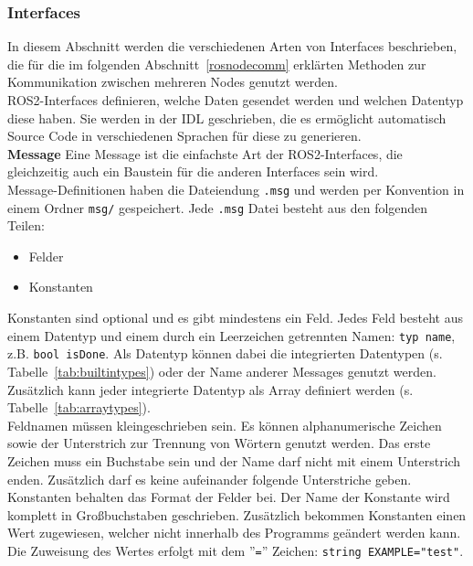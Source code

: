 \subsubsection{Interfaces}
In diesem Abschnitt werden die verschiedenen Arten von Interfaces beschrieben, die für die im folgenden Abschnitt~\ref{rosnodecomm} erklärten Methoden zur Kommunikation zwischen mehreren Nodes genutzt werden.\\
\ac{ROS2}-Interfaces definieren, welche Daten gesendet werden und welchen Datentyp diese haben.
Sie werden in der \ac{IDL} geschrieben, die es ermöglicht automatisch Source Code in verschiedenen Sprachen für diese zu generieren.\\

\textbf{Message} Eine Message ist die einfachste Art der \ac{ROS2}-Interfaces, die gleichzeitig auch ein Baustein für die anderen Interfaces sein wird.\\
Message-Definitionen haben die Dateiendung \verb|.msg| und werden per Konvention in einem Ordner \verb|msg/| gespeichert.
Jede \verb|.msg| Datei besteht aus den folgenden Teilen:
\begin{itemize}
\item Felder
\item Konstanten
\end{itemize}
Konstanten sind optional und es gibt mindestens ein Feld.
Jedes Feld besteht aus einem Datentyp und einem durch ein Leerzeichen getrennten Namen: \verb|typ name|, z.B. \verb|bool isDone|.
Als Datentyp können dabei die integrierten Datentypen (s. Tabelle~\ref{tab:builtintypes}) oder der Name anderer Messages genutzt werden.
Zusätzlich kann jeder integrierte Datentyp als Array definiert werden (s. Tabelle~\ref{tab:arraytypes}).\\
Feldnamen müssen kleingeschrieben sein.
Es können alphanumerische Zeichen sowie der Unterstrich zur Trennung von Wörtern genutzt werden.
Das erste Zeichen muss ein Buchstabe sein und der Name darf nicht mit einem Unterstrich enden.
Zusätzlich darf es keine aufeinander folgende Unterstriche geben.\\
Konstanten behalten das Format der Felder bei.
Der Name der Konstante wird komplett in Großbuchstaben geschrieben.
Zusätzlich bekommen Konstanten einen Wert zugewiesen, welcher nicht innerhalb des Programms geändert werden kann.
Die Zuweisung des Wertes erfolgt mit dem ''\verb|=|'' Zeichen: \verb|string EXAMPLE="test"|.
